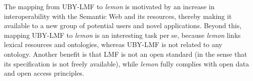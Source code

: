 
The mapping from UBY-LMF to \emph{lemon} is motivated by an increase in interoperability with the Semantic Web and its resources, thereby making it available to a new group of potential users and novel applications. %
Beyond this, mapping UBY-LMF to \emph{lemon} is an interesting task per se, because \emph{lemon} links lexical resources and
ontologies, whereas UBY-LMF is not related to any ontology. Another benefit is that LMF is not an open standard (in the sense that its specification is not freely available), while \emph{lemon} %
fully complies with open data and open access principles.






